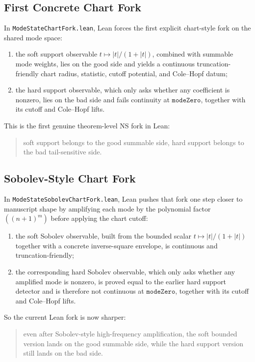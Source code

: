 \documentclass[11pt]{article}
\begin{document}
\subsection{First Concrete Chart Fork}

In \texttt{ModeStateChartFork.lean}, Lean forces the first explicit chart-style
fork on the shared mode space:
\begin{enumerate}[leftmargin=1.5em]
  \item the soft support observable
  \(t \mapsto |t|/(1+|t|)\), combined with summable mode weights, lies on the
  good side and yields a continuous truncation-friendly chart radius, statistic,
  cutoff potential, and Cole--Hopf datum;
  \item the hard support observable, which only asks whether any coefficient is
  nonzero, lies on the bad side and fails continuity at \(\texttt{modeZero}\),
  together with its cutoff and Cole--Hopf lifts.
\end{enumerate}

This is the first genuine theorem-level NS fork in Lean:
\begin{quote}
soft support belongs to the good summable side, hard support belongs to the
bad tail-sensitive side.
\end{quote}

\subsection{Sobolev-Style Chart Fork}

In \texttt{ModeStateSobolevChartFork.lean}, Lean pushes that fork one step
closer to manuscript shape by amplifying each mode by the polynomial factor
\(((n+1)^m)\) before applying the chart cutoff:
\begin{enumerate}[leftmargin=1.5em]
  \item the soft Sobolev observable, built from the bounded scalar
  \(t \mapsto |t|/(1+|t|)\) together with a concrete inverse-square envelope,
  is continuous and truncation-friendly;
  \item the corresponding hard Sobolev observable, which only asks whether any
  amplified mode is nonzero, is proved equal to the earlier hard support
  detector and is therefore not continuous at \(\texttt{modeZero}\), together
  with its cutoff and Cole--Hopf lifts.
\end{enumerate}

So the current Lean fork is now sharper:
\begin{quote}
even after Sobolev-style high-frequency amplification, the soft bounded version
lands on the good summable side, while the hard support version still lands on
the bad side.
\end{quote}
\end{document}
